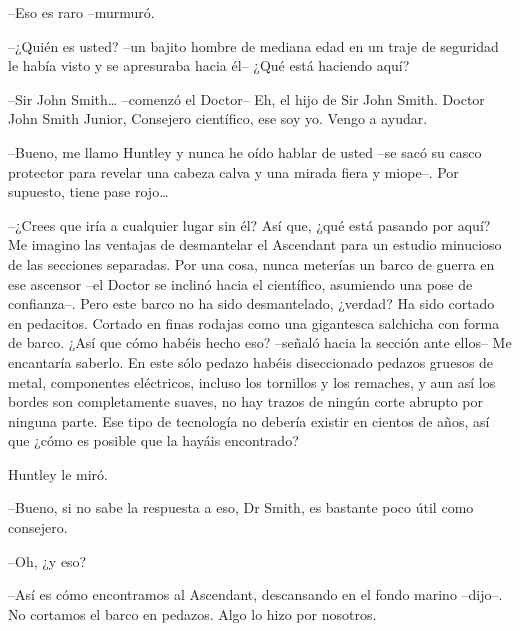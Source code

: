 {--Eso es raro --murmuró.}

{--¿Quién es usted? --un bajito hombre de mediana edad en un traje de
 seguridad le había visto y se apresuraba hacia él-- ¿Qué está haciendo
aquí?}

{--Sir John Smith\ldots{} --comenzó el Doctor-- Eh, el hijo de Sir John
 Smith. Doctor John Smith Junior, Consejero científico, ese soy yo. Vengo
a ayudar.}

{--Bueno, me llamo Huntley y nunca he oído hablar de usted --se sacó su
 casco protector para revelar una cabeza calva y una mirada fiera y
 miope--. Por supuesto, tiene pase rojo\ldots{}}

{--¿Crees que iría a cualquier lugar sin él? Así que, ¿qué está pasando
 por aquí? Me imagino las ventajas de desmantelar el Ascendant para un
 estudio minucioso de las secciones separadas. Por una cosa, nunca
 meterías un barco de guerra en ese ascensor --el Doctor se inclinó hacia
 el científico, asumiendo una pose de confianza--. Pero este barco no ha
 sido desmantelado, ¿verdad? Ha sido cortado en pedacitos. Cortado en
 finas rodajas como una gigantesca salchicha con forma de barco. ¿Así que
 cómo habéis hecho eso? --señaló hacia la sección ante ellos-- Me
 encantaría saberlo. En este sólo pedazo habéis diseccionado pedazos
 gruesos de metal, componentes eléctricos, incluso los tornillos y los
 remaches, y aun así los bordes son completamente suaves, no hay trazos
 de ningún corte abrupto por ninguna parte. Ese tipo de tecnología no
 debería existir en cientos de años, así que ¿cómo es posible que la
hayáis encontrado?}

{Huntley le miró.}

{--Bueno, si no sabe la respuesta a eso, Dr Smith, es bastante poco útil
como consejero.}

{--Oh, ¿y eso?}

{--Así es cómo encontramos al Ascendant, descansando en el fondo marino
--dijo--. No cortamos el barco en pedazos. Algo lo hizo por nosotros.}
